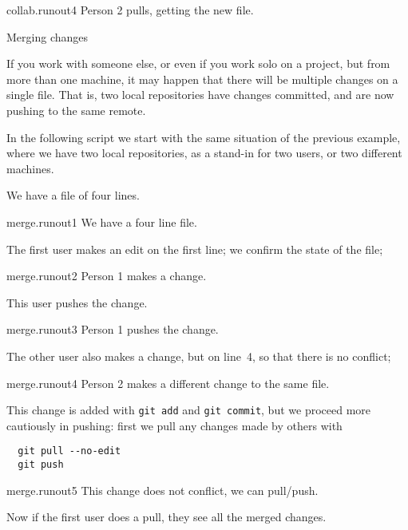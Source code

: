 \begin{gitstep}{collab.runout4}
  Person 2 pulls, getting the new file.
\end{gitstep}

 {Merging changes}

If you work with someone else, or even if you work solo on a project,
but from more than one machine, it may happen that there will be multiple
changes on a single file. That is, two local repositories have changes committed,
and are now pushing to the same remote.

In the following script we start with the same situation of the previous example,
where we have two local repositories, as a stand-in for two users,
or two different machines.

We have a file of four lines.

\begin{gitstep}{merge.runout1}
  We have a four line file.
\end{gitstep}

The first user makes an edit on the first line; we confirm the state of the file;

\begin{gitstep}{merge.runout2}
  Person 1 makes a change.
\end{gitstep}

This user pushes the change.

\begin{gitstep}{merge.runout3}
  Person 1 pushes the change.
\end{gitstep}

The other user also makes a change, but on line~4, so that there is no conflict;

\begin{gitstep}{merge.runout4}
  Person 2 makes a different change to the same file.
\end{gitstep}

This change is added with \lstinline{git add} and \lstinline{git commit},
but we proceed more cautiously in pushing: first we pull any changes made by others with
\begin{lstlisting}
  git pull --no-edit
  git push
\end{lstlisting}

\begin{gitstep}{merge.runout5}
  This change does not conflict, we can pull/push.
\end{gitstep}

Now if the first user does a pull, they see all the merged changes.

